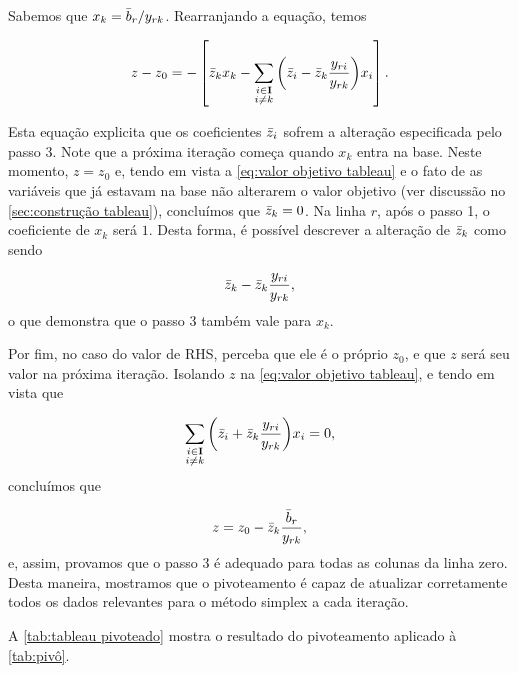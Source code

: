 Sabemos que $x_{k} = \bar{b}_{r}/ y_{rk}$. Rearranjando a equação, temos

\begin{equation}\label{eq:valor objetivo tableau}
    z - z_0 = - \left[\bar{z}_{k}x_{k} - \sum_{\substack{i \in  \vb I \\ i \neq k}}{\left(\bar{z}_{i} - \bar{z}_{k}\frac{ y_{ri}}{ y_{rk}}\right)}x_{i}\right].
\end{equation}

Esta equação explicita que os coeficientes $\bar{z}_{i}$ sofrem a alteração especificada pelo passo 3. Note que a próxima iteração começa quando $x_{k}$ entra na base. Neste momento, $z = z_0$ e, tendo em vista a \cref{eq:valor objetivo tableau} e o fato de as variáveis que já estavam na base não alterarem o valor objetivo (ver discussão no \cref{sec:construção tableau}), concluímos que $\bar{z}_{k} = 0$. Na linha $r$, após o passo 1, o coeficiente de $x_{k}$ será $1$. Desta forma, é possível descrever a alteração de $\bar{z}_{k}$ como sendo

\begin{equation}
    \bar{z}_{k} - \bar{z}_{k}\frac{ y_{ri}}{ y_{rk}},
\end{equation}
o que demonstra que o passo 3 também vale para $x_{k}$.

Por fim, no caso do valor de RHS, perceba que ele é o próprio $z_0$, e que $z$ será seu valor na próxima iteração. Isolando $z$ na \cref{eq:valor objetivo tableau}, e tendo em vista que 

\begin{equation}
    \sum_{\substack{i \in  \vb I \\ i \neq k}}{\left(\bar{z}_{i} + \bar{z}_{k}\frac{ y_{ri}}{ y_{rk}}\right)}x_{i} = 0,
\end{equation}
concluímos que

\begin{equation}
    z = z_0 - \bar{z}_{k}\frac{\bar{b}_{r}}{ y_{rk}},
\end{equation}
e, assim, provamos que o passo 3 é adequado para todas as colunas da linha zero. Desta maneira, mostramos que o pivoteamento é capaz de atualizar corretamente todos os dados relevantes para o método simplex a cada iteração.

A \cref{tab:tableau pivoteado} mostra o resultado do pivoteamento aplicado à \cref{tab:pivô}.

